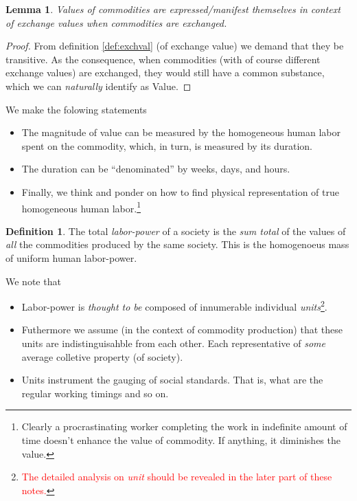 \documentclass[12pt]{extarticle}
\newtheorem{lemma}[theorem]{Lemma}
\theoremstyle{definition}
\newtheorem{definition}{Definition}[section]
\newenvironment{remark}[1][Remark]{\begin{trivlist}
\item[\hskip \labelsep {\bfseries #1}]}{\end{trivlist}}
\begin{document}
      \begin{lemma}
        \label{lemma:valinexval}
        Values of commodities are expressed/manifest themselves in context of exchange values when commodities are exchanged.
      \end{lemma}

      \begin{proof}
        From definition \ref{def:exchval} (of exchange value) we demand that they be transitive.  As the consequence, when commodities (with of course different exchange values) are exchanged, they would still have a common substance, which we can \emph{naturally} identify as Value. 
      \end{proof}

      \begin{remark}
        We make the folowing statements
        \begin{itemize}
        \item The magnitude of value can be measured by the homogeneous human labor spent on the commodity, which, in turn, is measured by its duration.
        \item The duration can be ``denominated'' by weeks, days, and hours.
          \item Finally, we think and ponder on how to find physical representation of true homogeneous human labor.\footnote{Clearly a procrastinating worker completing the work in indefinite amount of time doesn't enhance the value of commodity.  If anything, it diminishes the value.}  
          \end{itemize} 
        \end{remark}

        \begin{definition}
          The total \emph{labor-power} of a society is the \emph{sum total} of the values of \emph{all} the commodities produced by the same society.  This is the homogenoeus mass of uniform human labor-power.
        \end{definition}

        \begin{remark}
          We note that
          \begin{itemize}
          \item Labor-power is \emph{thought to be} composed of innumerable individual \emph{units}\footnote{\textcolor{red}{The detailed analysis on \emph{unit} should be revealed in the later part of these notes.}}.
            \item Futhermore we assume (in the context of commodity production) that these units are indistinguisahble from each other.  Each representative of \emph{some} average colletive property (of society).
            \item Units instrument the gauging of social standards.  That is, what are the regular working timings and so on.
          \end{itemize}
        \end{remark}
        
\end{document}
